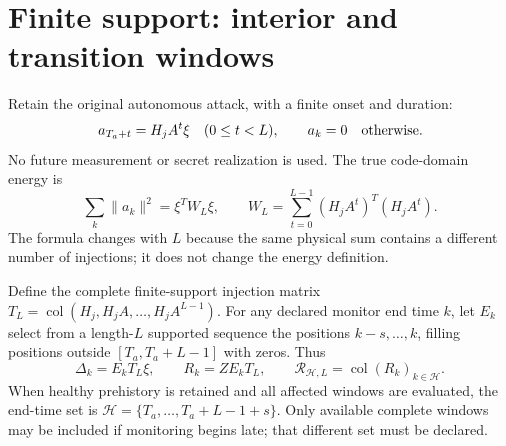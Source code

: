 \documentclass[11pt,a4paper]{article}
\DeclareMathOperator{\col}{col}
\begin{document}
\section{Finite support: interior and transition windows}
\label{rev:support}
Retain the original autonomous attack, with a finite onset and duration:
\begin{equation}
 a_{T_a+t}=H_jA^t\xi\quad(0\le t<L),\qquad
 a_k=0\quad\hbox{otherwise}.\label{rev:autonomous}
\end{equation}
No future measurement or secret realization is used.
The true code-domain energy is
\begin{equation}
 \sum_k\|a_k\|^2=\xi^TW_L\xi,\qquad
 W_L=\sum_{t=0}^{L-1}(H_jA^t)^T(H_jA^t).\label{rev:energy}
\end{equation}
The formula changes with $L$ because the same physical sum contains
a different number of injections; it does not change the energy definition.

Define the complete finite-support injection matrix
$T_L=\col(H_j,H_jA,\ldots,H_jA^{L-1})$. For any declared monitor end
time $k$, let $E_k$ select from a length-$L$ supported sequence the
positions $k-s,\ldots,k$, filling positions outside
$[T_a,T_a+L-1]$ with zeros. Thus
\begin{equation}
 \Delta_k=E_kT_L\xi,\qquad
 R_k=ZE_kT_L,\qquad
 \mathscr R_{\mathcal H,L}=\col(R_k)_{k\in\mathcal H}.
 \label{rev:finiteR}
\end{equation}
When healthy prehistory is retained and all affected windows are evaluated,
the end-time set is $\mathcal H=\{T_a,\ldots,T_a+L-1+s\}$.
Only available complete windows may be included if monitoring begins late;
that different set must be declared.
\end{document}
